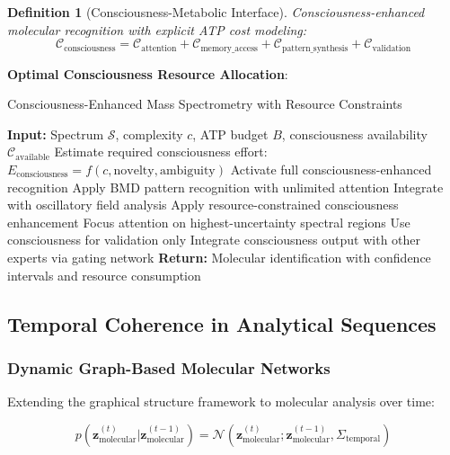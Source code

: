 \documentclass[11pt,a4paper]{article}
\newtheorem{definition}[theorem]{Definition}
\theoremstyle{remark}
\begin{document}
\begin{definition}[Consciousness-Metabolic Interface]
Consciousness-enhanced molecular recognition with explicit ATP cost modeling:
\begin{equation}
\mathcal{C}_{\text{consciousness}} = \mathcal{C}_{\text{attention}} + \mathcal{C}_{\text{memory\_access}} + \mathcal{C}_{\text{pattern\_synthesis}} + \mathcal{C}_{\text{validation}}
\end{equation}
\end{definition}

\textbf{Optimal Consciousness Resource Allocation}:
\begin{algorithm}[H]
\caption{Consciousness-Enhanced Mass Spectrometry with Resource Constraints}
\begin{algorithmic}[1]
\State \textbf{Input:} Spectrum $\mathcal{S}$, complexity $c$, ATP budget $B$, consciousness availability $\mathcal{C}_{\text{available}}$
\State Estimate required consciousness effort: $E_{\text{consciousness}} = f(c, \text{novelty}, \text{ambiguity})$
    \State Activate full consciousness-enhanced recognition
    \State Apply BMD pattern recognition with unlimited attention
    \State Integrate with oscillatory field analysis
\Else
    \State Apply resource-constrained consciousness enhancement
    \State Focus attention on highest-uncertainty spectral regions
    \State Use consciousness for validation only
\EndIf
\State Integrate consciousness output with other experts via gating network
\State \textbf{Return:} Molecular identification with confidence intervals and resource consumption
\end{algorithmic}
\end{algorithm}

\subsection{Temporal Coherence in Analytical Sequences}

\subsubsection{Dynamic Graph-Based Molecular Networks}

Extending the graphical structure framework to molecular analysis over time:

\begin{equation}
p(\mathbf{z}_{\text{molecular}}^{(t)} | \mathbf{z}_{\text{molecular}}^{(t-1)}) = \mathcal{N}(\mathbf{z}_{\text{molecular}}^{(t)}; \mathbf{z}_{\text{molecular}}^{(t-1)}, \Sigma_{\text{temporal}})
\end{equation}
\end{document}
